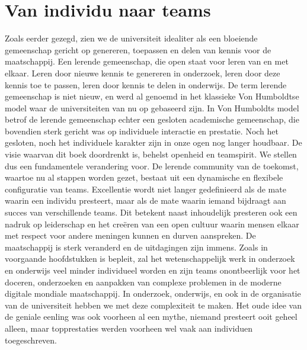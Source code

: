 \documentclass[smallauthor, chapterhaspagenum, nochapterinheader, pagenuminheader,  bigchapnum,medium2, tocpages, garamond, titleinheader]{jote-book}
\begin{document}
	\section{Van individu naar teams}



	Zoals eerder gezegd, zien we de universiteit idealiter als een bloeiende gemeenschap gericht op genereren, toepassen en delen van kennis voor de maatschappij. Een lerende gemeenschap, die open staat voor leren van en met elkaar. Leren door nieuwe kennis te genereren in onderzoek, leren door deze kennis toe te passen, leren door kennis te delen in onderwijs. De term lerende gemeenschap is niet nieuw, en werd al genoemd in het klassieke Von Humboldtse model waar de universiteiten van nu op gebaseerd zijn. In Von Humboldts model betrof de lerende gemeenschap echter een gesloten academische gemeenschap, die bovendien sterk gericht was op individuele interactie en prestatie. Noch het gesloten, noch het individuele karakter zijn in onze ogen nog langer houdbaar. De visie waarvan dit boek doordrenkt is, behelst openheid en teamspirit. We stellen dus een fundamentele verandering voor. De lerende community van de toekomst, waartoe nu al stappen worden gezet, bestaat uit een dynamische en flexibele configuratie van teams. Excellentie wordt niet langer gedefinieerd als de mate waarin een individu presteert, maar als de mate waarin iemand bijdraagt aan succes van verschillende teams. Dit betekent naast inhoudelijk presteren ook een nadruk op leiderschap en het creëren van een open cultuur waarin mensen elkaar met respect voor andere meningen kunnen en durven aanspreken. De maatschappij is sterk veranderd en de uitdagingen zijn immens. Zoals in voorgaande hoofdstukken is bepleit, zal het wetenschappelijk werk in onderzoek en onderwijs veel minder individueel worden en zijn teams onontbeerlijk voor het doceren, onderzoeken en aanpakken van complexe problemen in de moderne digitale mondiale maatschappij. In onderzoek, onderwijs, en ook in de organisatie van de universiteit hebben we met deze complexiteit te maken. Het oude idee van de geniale eenling was ook voorheen al een mythe, niemand presteert ooit geheel alleen, maar topprestaties werden voorheen wel vaak aan individuen toegeschreven.
\end{document}
